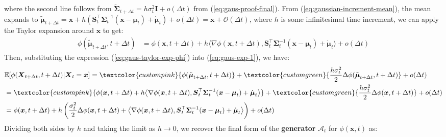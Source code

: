 \documentclass{article}
\newcommand{\greentext}[1]{\textcolor{customgreen}{#1}}
\newcommand{\pinktext}[1]{\textcolor{custompink}{#1}}
\begin{document}
where the second line follows from $\tilde{\boldsymbol{\Sigma}}_{t+\Delta t}=h\sigma_t^2\boldsymbol{I}+o(\Delta t)$ from (\ref{eq:gaus-proof-final}). From (\ref{eq:gaussian-increment-mean}), the mean expands to $\tilde{\boldsymbol{\mu}}_{t+\Delta t}=\boldsymbol{x}+h(\boldsymbol{S}_t^{\top}\boldsymbol{\Sigma}_t^{-1}(\boldsymbol{x}-\boldsymbol{\mu}_t)+\dot{\boldsymbol{\mu}}_t)+o(\Delta t)=\boldsymbol{x}+\mathcal{O}(\Delta t)$, where $h$ is some infinitesimal time increment, we can apply the Taylor expansion around $\boldsymbol{x}$ to get:
\begin{align}
    \phi(\tilde{\boldsymbol{\mu}}_{t+\Delta t}, t+\Delta t)&=\phi(\boldsymbol{x},t+\Delta t)+h\big\langle \nabla\phi(\boldsymbol{x},t+\Delta t),  \boldsymbol{S}_t^{\top}\boldsymbol{\Sigma}_t^{-1}(\boldsymbol{x}-\boldsymbol{\mu}_t)+ \dot{\boldsymbol{\mu}}_t\big\rangle +o(\Delta t)\label{eq:gaus-taylor-exp-phi}
\end{align}
Then, substituting the expression (\ref{eq:gaus-taylor-exp-phi}) into (\ref{eq:gaus-exp-1}), we have:
\begin{align}
    &\mathbb{E}[\phi(\boldsymbol{X}_{t+\Delta t},t+\Delta t)|\boldsymbol{X}_t=\boldsymbol{x}]=\pinktext{\phi(\tilde{\boldsymbol{\mu}}_{t+\Delta t}, t+\Delta t)}+\greentext{\frac{h\sigma_t^2}{2}\Delta \phi(\tilde{\boldsymbol{\mu}}_{t+\Delta t}, t+\Delta t)}+o(\Delta t)\nonumber\\
    &=\pinktext{\phi(\boldsymbol{x},t+\Delta t)+h\big\langle \nabla\phi(\boldsymbol{x},t+\Delta t),  \boldsymbol{S}_t^{\top}\boldsymbol{\Sigma}_t^{-1}(\boldsymbol{x}-\boldsymbol{\mu}_t)+ \dot{\boldsymbol{\mu}}_t\big\rangle }+\greentext{\frac{h\sigma_t^2}{2}\Delta \phi(\boldsymbol{x}, t+\Delta t)}+ o(\Delta t)\nonumber\\
    &=\phi(\boldsymbol{x},t+\Delta t)+h\left(\frac{\sigma^2_t}{2}\Delta\phi(\boldsymbol{x},t+\Delta t)+\big\langle \nabla\phi(\boldsymbol{x},t+\Delta t),  \boldsymbol{S}_t^{\top}\boldsymbol{\Sigma}_t^{-1}(\boldsymbol{x}-\boldsymbol{\mu}_t)+ \dot{\boldsymbol{\mu}}_t\big\rangle \right)+o(\Delta t)
\end{align}
Dividing both sides by $h$ and taking the limit as $h \to 0$, we recover the final form of the \textbf{generator} $\mathcal{A}_t$ for $\phi(\boldsymbol{x},t)$ as:
\end{document}
